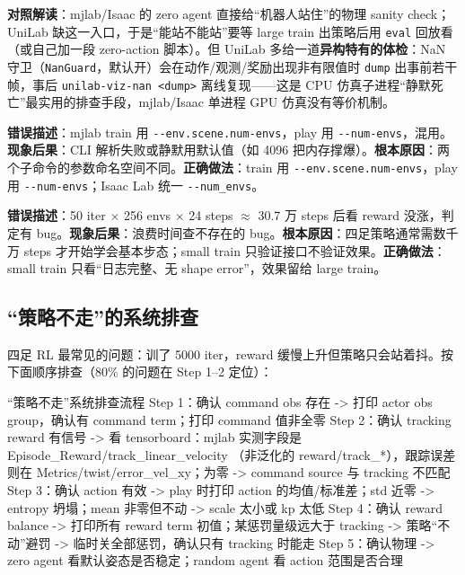 \textbf{对照解读}：mjlab/Isaac 的 zero agent 直接给“机器人站住”的物理 sanity check；UniLab 缺这一入口，于是“能站不能站”要等 large train 出策略后用 \verb|eval| 回放看（或自己加一段 zero-action 脚本）。但 UniLab 多给一道\textbf{异构特有的体检}：NaN 守卫（\verb|NanGuard|，默认开）会在动作/观测/奖励出现非有限值时 \verb|dump| 出事前若干帧，事后 \verb|unilab-viz-nan <dump>| 离线复现——这是 CPU 仿真子进程“静默死亡”最实用的排查手段，mjlab/Isaac 单进程 GPU 仿真没有等价机制。

\begin{pitfall}
\textbf{错误描述}：mjlab train 用 \verb|--env.scene.num-envs|，play 用 \verb|--num-envs|，混用。\textbf{现象后果}：CLI 解析失败或静默用默认值（如 4096 把内存撑爆）。\textbf{根本原因}：两个子命令的参数命名空间不同。\textbf{正确做法}：train 用 \verb|--env.scene.num-envs|，play 用 \verb|--num-envs|；Isaac Lab 统一 \verb|--num_envs|。
\end{pitfall}

\begin{pitfall}
\textbf{错误描述}：50 iter $\times$ 256 envs $\times$ 24 steps $\approx$ 30.7 万 steps 后看 reward 没涨，判定有 bug。\textbf{现象后果}：浪费时间查不存在的 bug。\textbf{根本原因}：四足策略通常需数千万 steps 才开始学会基本步态；small train 只验证接口不验证效果。\textbf{正确做法}：small train 只看“日志完整、无 shape error”，效果留给 large train。
\end{pitfall}

\subsection{“策略不走”的系统排查}
\label{sec:rlmc-ql-train-diag}

四足 RL 最常见的问题：训了 5000 iter，reward 缓慢上升但策略只会站着抖。按下面顺序排查（80\% 的问题在 Step 1--2 定位）：

\begin{codebox}{“策略不走”系统排查流程}
Step 1：确认 command obs 存在
  -> 打印 actor obs group，确认有 command term；打印 command 值非全零
Step 2：确认 tracking reward 有信号
  -> 看 tensorboard：mjlab 实测字段是 Episode_Reward/track_linear_velocity
     （非泛化的 reward/track_*），跟踪误差则在 Metrics/twist/error_vel_xy；为零 -> command source 与 tracking 不匹配
Step 3：确认 action 有效
  -> play 时打印 action 的均值/标准差；std 近零 -> entropy 坍塌；mean 非零但不动 -> scale 太小或 kp 太低
Step 4：确认 reward balance
  -> 打印所有 reward term 初值；某惩罚量级远大于 tracking -> 策略“不动”避罚
  -> 临时关全部惩罚，确认只有 tracking 时能走
Step 5：确认物理
  -> zero agent 看默认姿态是否稳定；random agent 看 action 范围是否合理
\end{codebox}


